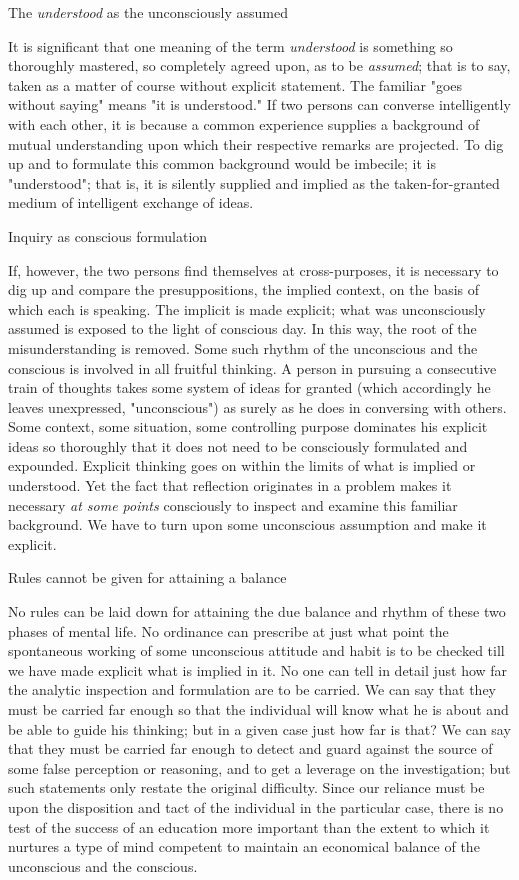 \documentclass[letterpaper]{book}
\begin{document}
The \emph{understood} as the unconsciously assumed

It is significant that one meaning of the term \emph{understood} is
something so thoroughly mastered, so completely agreed upon, as to be
\emph{assumed}; that is to say, taken as a matter of course without
explicit statement. The familiar "goes without saying" means "it is
understood." If two persons can converse intelligently with each other,
it is because a common experience supplies a background of mutual
understanding upon which their respective remarks are projected. To dig
up and to formulate this common background would be imbecile; it is
"understood"; that is, it is silently supplied and implied as the
taken-for-granted medium of intelligent exchange of ideas.

Inquiry as conscious formulation

If, however, the two persons find themselves at cross-purposes, it is
necessary to dig up and compare the presuppositions, the implied
context, on the basis of which each is speaking. The implicit is made
explicit; what was unconsciously assumed is exposed to the light of
conscious day. In this way, the root of the
misunderstanding
is removed. Some such rhythm of the unconscious and the conscious is
involved in all fruitful thinking. A person in pursuing a consecutive
train of thoughts takes some system of ideas for granted (which
accordingly he leaves unexpressed, "unconscious") as surely as he does
in conversing with others. Some context, some situation, some
controlling purpose dominates his explicit ideas so thoroughly that it
does not need to be consciously formulated and expounded. Explicit
thinking goes on within the limits of what is implied or understood. Yet
the fact that reflection originates in a problem makes it necessary
\emph{at some points} consciously to inspect and examine this familiar
background. We have to turn upon some unconscious assumption and make it
explicit.

Rules cannot be given for attaining a balance

No rules can be laid down for attaining the due balance and rhythm of
these two phases of mental life. No ordinance can prescribe at just what
point the spontaneous working of some unconscious attitude and habit is
to be checked till we have made explicit what is implied in it. No one
can tell in detail just how far the analytic inspection and formulation
are to be carried. We can say that they must be carried far enough so
that the individual will know what he is about and be able to guide his
thinking; but in a given case just how far is that? We can say that they
must be carried far enough to detect and guard against the source of
some false perception or reasoning, and to get a leverage on the
investigation; but such statements only restate the original difficulty.
Since our reliance must be upon the disposition and tact of the
individual in the particular case, there is no test of the success of an
education more important than the extent to which it nurtures a type of
mind competent
to
maintain an economical balance of the unconscious and the conscious.
\end{document}
